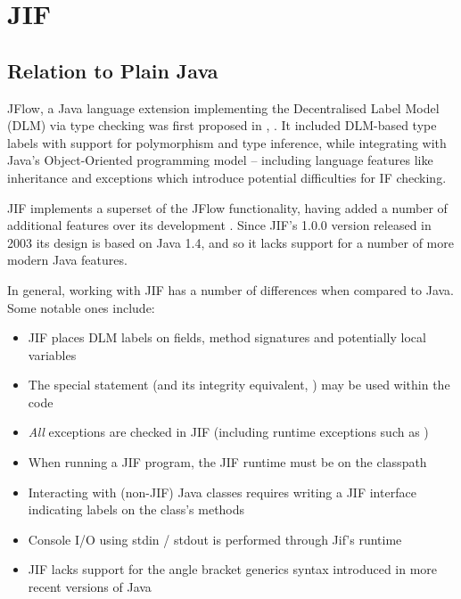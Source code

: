 \section{JIF}

\subsection{Relation to Plain Java}

JFlow, a Java language extension implementing the Decentralised Label Model (DLM) via type checking was first proposed in , \cite{myers1999jflow}. It included DLM-based type labels with support for polymorphism and type inference, while integrating with Java's Object-Oriented programming model -- including language features like inheritance and exceptions which introduce potential difficulties for IF checking.

JIF implements a superset of the JFlow functionality, having added a number of additional features over its development \cite{jifwebsite}. Since JIF's 1.0.0 version released in 2003 its design is based on Java 1.4, and so it lacks support for a number of more modern Java features.

In general, working with JIF has a number of differences when compared to Java. Some notable ones include:

\begin{itemize}
	\item JIF places DLM labels on fields, method signatures and potentially local variables
	
	\item The special  statement (and its integrity equivalent, ) may be used within the code
	
	\item \textit{All} exceptions are checked in JIF (including runtime exceptions such as )
	
	\item When running a JIF program, the JIF runtime must be on the classpath
	
	\item Interacting with (non-JIF) Java classes requires writing a JIF interface indicating labels on the class's methods
	
	\item Console I/O using stdin / stdout is performed through Jif's runtime
	
	\item JIF lacks support for the angle bracket generics syntax introduced in more recent versions of Java
\end{itemize}

